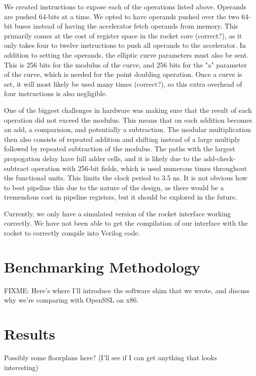 \documentclass[twocolumn]{article}
\begin{document}
We created instructions to expose each of the operations listed above. Operands
are pushed 64-bits at a time. We opted to have operands pushed over the two 64-bit
buses instead of having the accelerator fetch operands from memory. This primarily 
comes at the cost of register space in the rocket core (correct?), as it only takes 
four to twelve instructions to push all operands to the accelerator. In addition to 
setting the operands, the elliptic curve parameters must also be sent. This is 256 bits
for the modulus of the curve, and 256 bits for the "a" parameter of the curve, which
is needed for the point doubling operation. Once a curve is set, it will most likely
be used many times (correct?), so this extra overhead of four instructions is also 
negligible. 

One of the biggest challenges in hardware was making sure that the result of each 
operation did not exceed the modulus. This means that on each addition becomes an 
add, a comparision, and potentially a subtraction. The modular multiplication then 
also consists of repeated addition and shifting instead of a large multiply followed
by repeated subtraction of the modulus. The paths with the largest propogation delay
have full adder cells, and it is likely due to the add-check-subtract operation with 
256-bit fields, which is used numerous times throughout the functional units. This 
limits the clock period to 3.5 ns. It is not obvious how to best pipeline this due 
to the nature of the design, as there would be a tremendous cost in pipeline registsrs, 
but it should be explored in the future. 

Currently, we only have a simulated version of the rocket interface working correctly. 
We have not been able to get the compilation of our interface with the rocket to correctly
compile into Verilog code. 

\section{Benchmarking Methodology}

FIXME: Here's where I'll introduce the software shim that we wrote,
and discuss why we're comparing with OpenSSL on x86.

\section{Results}

Possibly some floorplans here?
(I'll see if I can get anything that looks interesting)
\end{document}

